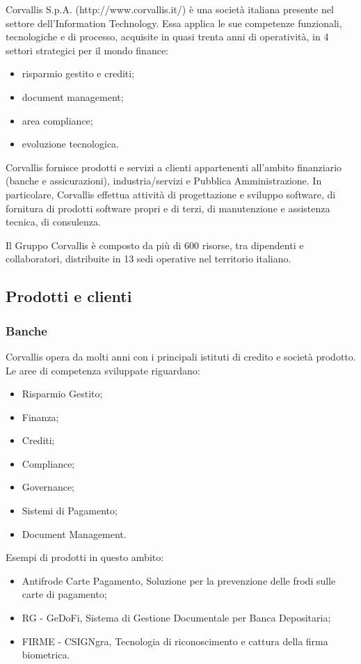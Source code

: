 Corvallis S.p.A. (http://www.corvallis.it/) è una società italiana presente nel settore dell’Information Technology. Essa applica le sue competenze funzionali, tecnologiche e di processo, acquisite in quasi trenta anni di operatività, in 4 settori strategici per il mondo finance:
\begin{itemize}

\item risparmio gestito e crediti;
\item document management;
\item area compliance;
\item evoluzione tecnologica.\\
\end{itemize}

Corvallis fornisce prodotti e servizi a clienti appartenenti all'ambito finanziario (banche e assicurazioni), industria/servizi e Pubblica Amministrazione. In particolare, Corvallis effettua attività di progettazione e sviluppo software, di fornitura di prodotti software propri e di terzi, di manutenzione e assistenza tecnica, di consulenza.

Il Gruppo Corvallis è composto da più di 600 risorse, tra dipendenti e collaboratori, distribuite in 13 sedi operative nel territorio italiano.

\subsection{Prodotti e clienti}
\label{1.2}
\subsubsection{Banche}
\label{1.2.1}
Corvallis opera da molti anni con i principali istituti di credito e società prodotto. Le aree di competenza sviluppate riguardano:
\begin{itemize}
\item Risparmio Gestito;
\item Finanza;
\item Crediti;
\item Compliance;
\item Governance;
\item Sistemi di Pagamento;
\item Document Management.\\
\end{itemize}
Esempi di prodotti in questo ambito:
\begin{itemize}
\item Antifrode Carte Pagamento, Soluzione per la prevenzione delle frodi sulle carte di pagamento;
\item RG - GeDoFi, Sistema di Gestione Documentale per Banca Depositaria;
\item FIRME - CSIGNgra, Tecnologia di riconoscimento e cattura della firma biometrica.
\end{itemize}
